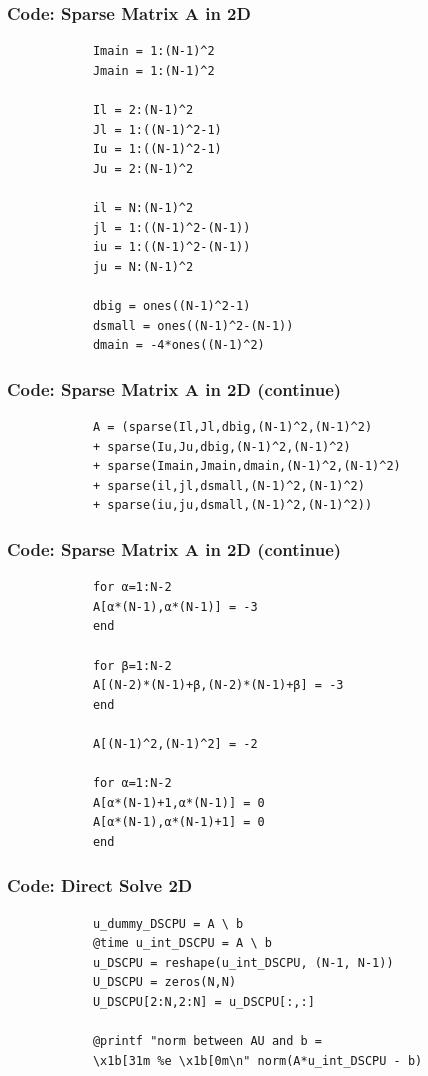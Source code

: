 \documentclass[aspectratio=169]{beamer}
\begin{document}
	\begin{frame}[fragile]
		\frametitle{Code: Sparse Matrix A in 2D}
		\begin{verbatim}
			Imain = 1:(N-1)^2
			Jmain = 1:(N-1)^2
			
			Il = 2:(N-1)^2
			Jl = 1:((N-1)^2-1)
			Iu = 1:((N-1)^2-1)
			Ju = 2:(N-1)^2
			
			il = N:(N-1)^2
			jl = 1:((N-1)^2-(N-1))
			iu = 1:((N-1)^2-(N-1))
			ju = N:(N-1)^2
			
			dbig = ones((N-1)^2-1)
			dsmall = ones((N-1)^2-(N-1))
			dmain = -4*ones((N-1)^2)
		\end{verbatim}
	\end{frame}
	
	\begin{frame}[fragile]
		\frametitle{Code: Sparse Matrix A in 2D (continue)}
		\begin{verbatim}
			A = (sparse(Il,Jl,dbig,(N-1)^2,(N-1)^2)
			+ sparse(Iu,Ju,dbig,(N-1)^2,(N-1)^2)
			+ sparse(Imain,Jmain,dmain,(N-1)^2,(N-1)^2)
			+ sparse(il,jl,dsmall,(N-1)^2,(N-1)^2)
			+ sparse(iu,ju,dsmall,(N-1)^2,(N-1)^2))
		\end{verbatim}
	\end{frame}
	
	\begin{frame}[fragile]
		\frametitle{Code: Sparse Matrix A in 2D (continue)}
		\begin{verbatim}
			for α=1:N-2
			A[α*(N-1),α*(N-1)] = -3
			end
			
			for β=1:N-2
			A[(N-2)*(N-1)+β,(N-2)*(N-1)+β] = -3
			end
			
			A[(N-1)^2,(N-1)^2] = -2
			
			for α=1:N-2
			A[α*(N-1)+1,α*(N-1)] = 0
			A[α*(N-1),α*(N-1)+1] = 0
			end
		\end{verbatim}
	\end{frame}
	
	\begin{frame}[fragile]
		\frametitle{Code: Direct Solve 2D}
		\begin{verbatim}
			u_dummy_DSCPU = A \ b
			@time u_int_DSCPU = A \ b
			u_DSCPU = reshape(u_int_DSCPU, (N-1, N-1))
			U_DSCPU = zeros(N,N)
			U_DSCPU[2:N,2:N] = u_DSCPU[:,:]
			
			@printf "norm between AU and b = 
			\x1b[31m %e \x1b[0m\n" norm(A*u_int_DSCPU - b)
		\end{verbatim}
	\end{frame}
	
\end{document}
